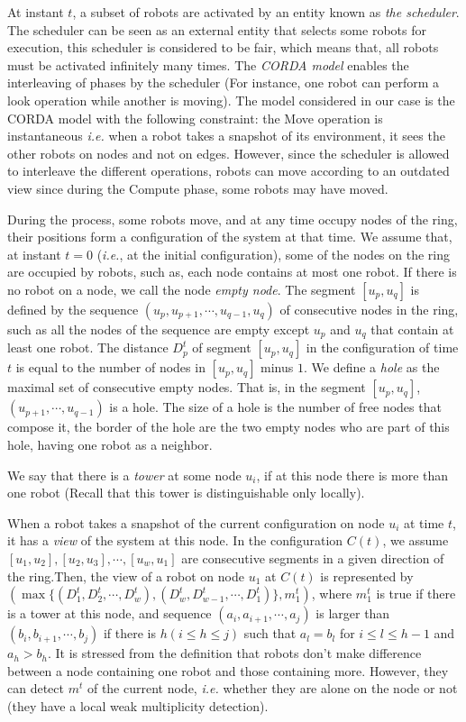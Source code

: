 \documentclass[11pt]{article}
\begin{document}
At instant $t$, a subset of robots are activated by an entity known as \textit{the scheduler}.
The scheduler can be seen as an external entity that selects some robots for execution, this scheduler is considered to be fair, which means that, all robots must be activated infinitely many times. The \textit{CORDA model} \cite{Pre01} enables the interleaving of phases by the scheduler 
(For instance, one robot can perform a look operation while another is moving).
The model considered in our case is the CORDA model with the following constraint: the Move operation is instantaneous \textit{i.e.} when a robot takes a snapshot of its environment, it sees the other robots on nodes and not on edges. However, since the scheduler is allowed to interleave the different operations, robots can move according to an outdated view since during the Compute phase, some robots may have moved.

During the process, some robots move, and at any time occupy nodes of the ring, their positions form a configuration of the system at that time. 
We assume that, at instant $t=0$ (\textit{i.e.}, at the initial configuration), some of the nodes on the ring are occupied by robots, such as, each node contains at most one robot. 
If there is no robot on a node, we call the node \textit{empty node}.
The segment $[u_p,u_q]$ is defined by the sequence $(u_p,u_{p+1},\cdots,u_{q-1},u_q)$ of consecutive nodes in the ring, such as all the nodes of the sequence are empty except $u_p$ and $u_q$ that contain at least one robot.
The distance $D_p^t$ of segment $[u_p,u_q]$ in the configuration of time $t$ is equal to the number of nodes in $[u_p,u_q]$ minus $1$.
We define a \textit{hole} as the maximal set of consecutive empty nodes. 
That is, in the segment $[u_p,u_q]$, $(u_{p+1},\cdots,u_{q-1})$ is a hole. 
The size of a hole is the number of free nodes that compose it, the border of the hole are the two empty nodes who are part of this hole, having one robot as a neighbor.

We say that there is a \textit{tower} at some node $u_{i}$, if at this node there is more than one robot (Recall that this tower is distinguishable only locally). 

When a robot takes a snapshot of the current configuration on node $u_{i}$ at time $t$, it has a \textit{view} of the system at this node.
In the configuration $C(t)$, we assume $[u_1,u_2],[u_2,u_3],\cdots,[u_w,u_1]$ are consecutive segments in a given direction of the ring.Then, the view of a robot on node $u_1$ at $C(t)$ is represented by \\$(\max\{(D_1^t,D_2^t,\cdots,D_w^t),(D_w^t,D_{w-1}^t,\cdots,D_1^t)\}, m_1^t)$, where
$m_1^t$ is true if there is a tower at this node, and sequence $(a_i,a_{i+1},\cdots, a_j)$ is larger than $(b_i,b_{i+1},\cdots,b_j)$ if there is $h (i\leq h\leq j)$ such that $a_l=b_l$ for $i\leq l \leq h-1$ and $a_h>b_h$.
It is stressed from the definition that robots don't make difference between a node containing one robot and those containing more. 
However, they can detect $m^t$ of the current node, \textit{i.e.} whether they are alone on the node or not (they have a local weak multiplicity detection). 
\end{document}
